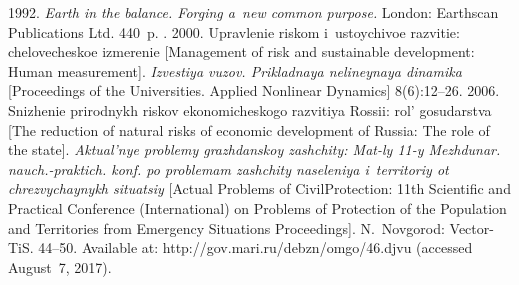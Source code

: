  \begin{multicols}{2}

\renewcommand{\bibname}{\protect\rmfamily References}

{\small\frenchspacing
 {%
 \begin{thebibliography}{99}
 
 1992. \textit{Earth in the balance. Forging a~new common purpose.} 
London: Earthscan Publications Ltd. 440~p.
. 2000. Uprav\-le\-nie 
ris\-kom i~ustoy\-chi\-voe raz\-vi\-tie: che\-lo\-ve\-che\-skoe iz\-m\-ere\-nie [Management of risk and 
sustainable development: Human measurement]. \textit{Izvestiya vuzov. Pri\-klad\-naya 
nelineynaya dinamika}  [Proceedings of the Universities. Applied Nonlinear 
Dynamics] 8(6):12--26.
 2006. Sni\-zhe\-nie pri\-rod\-nykh ris\-kov eko\-no\-mi\-che\-sko\-go 
raz\-vi\-tiya Ros\-sii: rol' go\-su\-dar\-st\-va
 [The reduction of natural risks of economic 
development of Russia: The role of the state]. \textit{Aktu\-al'\-nye prob\-le\-my 
grazh\-dan\-skoy za\-shchi\-ty: Mat-ly 11-y Mezhdunar.  
nauch.-praktich. konf. po problemam zashchity naseleniya i~territoriy ot\linebreak 
chrezvychaynykh situatsiy} [Actual Problems of Civil\linebreak Protection:  11th Scientific and 
Practical Conference (International) on Problems of Protection of the Population and 
Territories from Emergency Situations Proceedings]. 
N.~Novgorod: Vector-TiS. 44--50. Available at: {\sf 
http://gov.mari.ru/debzn/omgo/46.djvu} (accessed  August~7, 2017).


\end{thebibliography}}}
\end{multicols}
